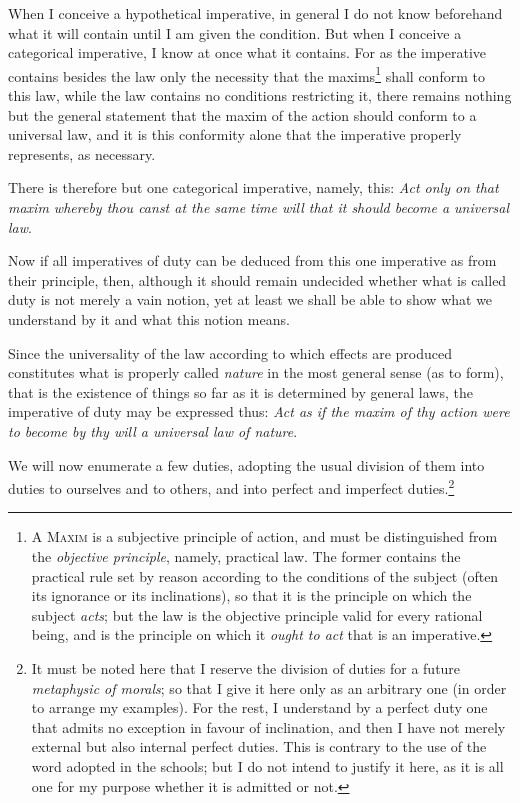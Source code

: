 \snip

When I conceive a hypothetical imperative, in general I do
not know beforehand what it will contain until I am given the
condition. But when I conceive a categorical imperative, I know at
once what it contains. For as the imperative contains besides the law
only the necessity that the maxims\footnote{A \textsc{Maxim} is a
subjective principle of action, and must be distinguished from the
\textit{objective principle}, namely, practical law. The former
contains the practical rule set by reason according to the conditions
of the subject (often its ignorance or its inclinations), so that it
is the principle on which the subject \textit{acts}; but the law is
the objective principle valid for every rational being, and is the
principle on which it \textit{ought to act} that is an imperative.}
shall conform to this law, while the law contains no conditions
restricting it, there remains nothing but the general statement that
the maxim of the action should conform to a universal law, and it is
this conformity alone that the imperative properly represents, as
necessary.

There is therefore but one categorical imperative, namely, this:
\textit{Act only on that maxim whereby thou canst at the same time
will that it should become a universal law}.

Now if all imperatives of duty can be deduced from this one imperative
as from their principle, then, although it should remain undecided
whether what is called duty is not merely a  vain notion, yet
at least we shall be able to show what we understand by it and what
this notion means.

Since the universality of the law according to which effects are
produced constitutes what is properly called \textit{nature} in the
most general sense (as to form), that is the existence of things so
far as it is determined by general laws, the imperative of duty may be
expressed thus: \textit{Act as if the maxim of thy action were to
become by thy will a universal law of nature}.

We will now enumerate a few duties, adopting the usual division of
them into duties to ourselves and to others, and into perfect and
imperfect duties.\footnote{It must be noted here that I reserve the
division of duties for a future \textit{metaphysic of morals}; so that
I give it here only as an arbitrary one (in order to arrange my
examples). For the rest, I understand by a perfect duty one that
admits no exception in favour of inclination, and then I have not
merely external but also internal perfect duties. This is contrary to
the use of the word adopted in the schools; but I do not intend to
justify it here, as it is all one for my purpose whether it is
admitted or not.}

